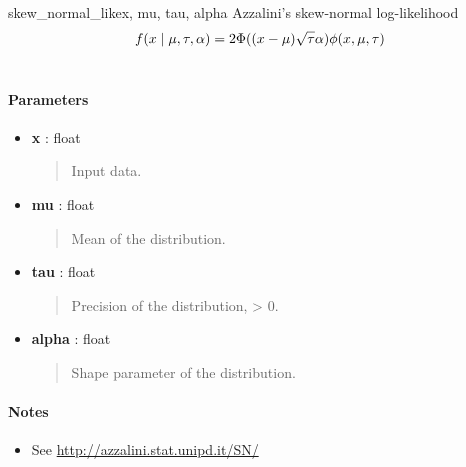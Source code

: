 \hypertarget{pymc.distributions.skew_normal_like}{}\begin{funcdesc}{skew\_normal\_like}{x, mu, tau, alpha}
Azzalini's skew-normal log-likelihood
\begin{gather}
\begin{split}f(x \mid \mu, \tau, \alpha) = 2 \Phi((x-\mu)\sqrt{\tau}\alpha) \phi(x,\mu,\tau)\end{split}\notag\\\begin{split}\end{split}\notag
\end{gather}\paragraph{Parameters}\begin{itemize}

\item[] \textbf{x} : float
\begin{quote}

Input data.
\end{quote}

\item[] \textbf{mu} : float
\begin{quote}

Mean of the distribution.
\end{quote}

\item[] \textbf{tau} : float
\begin{quote}

Precision of the distribution, \textgreater{} 0.
\end{quote}

\item[] \textbf{alpha} : float
\begin{quote}

Shape parameter of the distribution.
\end{quote}
\end{itemize}
\paragraph{Notes}
\begin{itemize}
\item {} 
See \href{http://azzalini.stat.unipd.it/SN/}{http://azzalini.stat.unipd.it/SN/}

\end{itemize}
\end{funcdesc}

